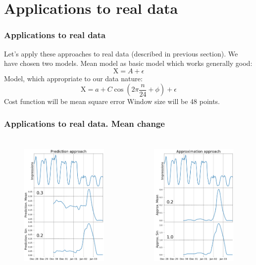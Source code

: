 \documentclass[intlimits, 9pt, unicode]{beamer}
\begin{document}
\section{Applications to real data}



\begin{frame}
    \frametitle{Applications to real data}
 
 Let's apply these approaches to real data (described in previous section).
We have chosen two models.
Mean model as basic model which works generally good:
$$ \mathrm{X} = A + \epsilon $$
Model, which appropriate to our data nature:
$$ \mathrm{X} = a + C\cos(2\pi \frac{n}{24} + \phi) + \epsilon $$
Cost function will be mean square error
Window size will be 48 points.
 
 \end{frame}



\begin{frame}
    \frametitle{Applications to real data. Mean change}
  \begin{columns}[T,onlytextwidth]
	\begin{figure}
	\includegraphics[height=6.5cm]{images/methods_comparison_1_1}
	\end{figure}
	
	\begin{figure}
	\includegraphics[height=6.5cm]{images/methods_comparison_1_2}
	\end{figure}
	
     \end{columns}

\end{frame}
\end{document}
